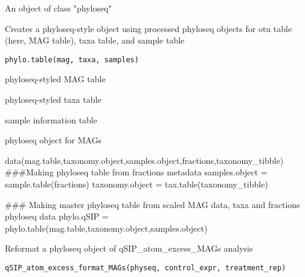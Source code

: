 \documentclass[a4paper]{book}
\begin{document}
%
\begin{Format}
An object of class "phyloseq"
\end{Format}
%
\begin{Description}\relax
Creates a phyloseq-style object using processed phyloseq objects for otu
table (here, MAG table), taxa table, and sample table
\end{Description}
%
\begin{Usage}
\begin{verbatim}
phylo.table(mag, taxa, samples)
\end{verbatim}
\end{Usage}
%
\begin{Arguments}
\begin{ldescription}
\item[\code{mag}] phyloseq-styled MAG table

\item[\code{taxa}] phyloseq-styled taxa table

\item[\code{samples}] sample information table
\end{ldescription}
\end{Arguments}
%
\begin{Value}
phyloseq object for MAGs
\end{Value}
%
\begin{Examples}
\begin{ExampleCode}

data(mag.table,taxonomy.object,samples.object,fractions,taxonomy_tibble)
###Making phyloseq table from fractions metadata
samples.object = sample.table(fractions)
taxonomy.object = tax.table(taxonomy_tibble)




### Making master phyloseq table from scaled MAG data, taxa and fractions phyloseq data
phylo.qSIP = phylo.table(mag.table,taxonomy.object,samples.object)


\end{ExampleCode}
\end{Examples}
%
\begin{Description}\relax
Reformat a phyloseq object of qSIP\_atom\_excess\_MAGs analysis
\end{Description}
%
\begin{Usage}
\begin{verbatim}
qSIP_atom_excess_format_MAGs(physeq, control_expr, treatment_rep)
\end{verbatim}
\end{Usage}
\end{document}
